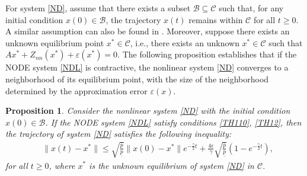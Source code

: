 \documentclass[journal,twoside,web]{ieeecolor}
\newtheorem{proposition}		[theorem]{Proposition}
\begin{document}
For system \eqref{ND}, assume that there exists a subset $\mathcal{B}\subseteq\mathcal{C}$ such that, for any initial condition $x(0)\in \mathcal{B}$, the trajectory $x(t)$ remains within $\mathcal{C}$ for all $t\geq 0$. A similar assumption can also be found in \cite{strasser2024koopman,van2023reprojection}. Moreover, suppose there exists an unknown equilibrium point $x^*\in \mathcal{C}$, i.e., there exists an unknown $x^*\in \mathcal{C}$ such that $Ax^*+Z_{nn}(x^*)+\varepsilon(x^*)=0$. The following proposition establishes that if the NODE system \eqref{NDL} is contractive, the nonlinear system \eqref{ND} converges to a neighborhood of its equilibrium point, with the size of the neighborhood determined by the approximation error $\varepsilon(x)$.
\begin{proposition}\label{proposition3}
Consider the nonlinear system \eqref{ND} with the initial condition $x(0)\in \mathcal{B}$. If the NODE system \eqref{NDL} satisfy conditions \eqref{TH110}, \eqref{TH12}, then the trajectory of system \eqref{ND} satisfies the following inequality:
 \begin{equation}\label{pro3}
 \begin{aligned}
&\|x(t)-x^*\|\leq \sqrt{\frac{\overline{p}}{\underline{p}}}\|x(0)-x^*\|e^{-\frac{\gamma }{2}t}+\frac{4\epsilon}{\gamma}\sqrt{\frac{\overline{p}}{\underline{p}}}(1-e^{-\frac{\gamma }{2}t}), 
\end{aligned}
\end{equation} 
for all $t\geq0$, where $x^*$ is the unknown equilibrium of system \eqref{ND} in $\mathcal{C}$.
\end{proposition}
\end{document}
